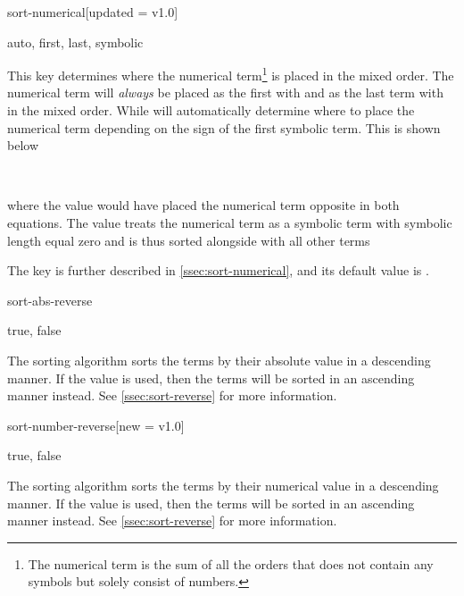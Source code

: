 	\begin{option}{sort-numerical}[updated = v1.0]
		\begin{values}[default = auto]
			auto, first, last, symbolic
		\end{values}
		This key determines where the numerical term\footnote{The numerical term is the sum of all the orders that does not contain any symbols but solely consist of numbers.\label{foot:numerical-term}} is placed in the mixed order. The numerical term will \emph{always} be placed as the first with  and as the last term with  in the mixed order. While  will automatically determine where to place the numerical term depending on the sign of the first symbolic term. This is shown below
		
		\begin{example}
			  \\
		\end{example}
		
		\noindent where the value  would have placed the numerical term opposite in both equations. The value  treats the numerical term as a symbolic term with symbolic length equal zero and is thus sorted alongside with all other terms
		\begin{example}
			\pdv[sort-numerical=symbolic, order={2+n,-a}]{f}{x,y}
		\end{example}
		The key is further described in \cref{ssec:sort-numerical}, and its default value is .
	\end{option}
	
	\begin{option}{sort-abs-reverse}
		\begin{values}[default = false]
			true, false
		\end{values}
		The sorting algorithm  sorts the terms by their absolute value in a descending manner. If the value  is used, then the terms will be sorted in an ascending manner instead. See \cref{ssec:sort-reverse} for more information.
	\end{option}
	
	\begin{option}{sort-number-reverse}[new = v1.0]
		\begin{values}[default = false]
			true, false
		\end{values}
		The sorting algorithm  sorts the terms by their numerical value in a descending manner. If the value  is used, then the terms will be sorted in an ascending manner instead. See \cref{ssec:sort-reverse} for more information.
	\end{option}
	
